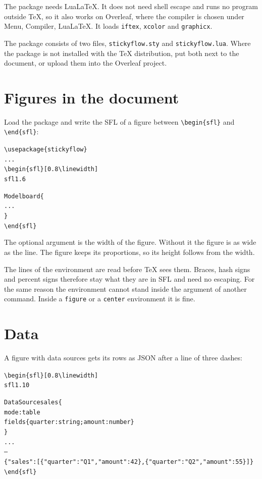 \documentclass{article}
\newenvironment{code}{\par\smallskip\begin{alltt}\small}{\end{alltt}\smallskip}
\begin{document}
The package needs LuaLaTeX. It does not need shell escape and runs no program outside TeX, so it also works on Overleaf, where the compiler
is chosen under Menu, Compiler, LuaLaTeX. It loads \texttt{iftex}, \texttt{xcolor} and \texttt{graphicx}.

The package consists of two files, \texttt{stickyflow.sty} and \texttt{stickyflow.lua}. Where the package is not installed with the TeX
distribution, put both next to the document, or upload them into the Overleaf project.

\section{Figures in the document}

Load the package and write the SFL of a figure between \texttt{\textbackslash{}begin\{sfl\}} and \texttt{\textbackslash{}end\{sfl\}}:

\begin{code}
\textbackslash{}usepackage\{stickyflow\}
...
\textbackslash{}begin\{sfl\}[0.8\textbackslash{}linewidth]
sfl 1.6

Model board \{
  ...
\}
\textbackslash{}end\{sfl\}
\end{code}

The optional argument is the width of the figure. Without it the figure is as wide as the line. The figure keeps its proportions, so its
height follows from the width.

The lines of the environment are read before TeX sees them. Braces, hash signs and percent signs therefore stay what they are in SFL and
need no escaping. For the same reason the environment cannot stand inside the argument of another command. Inside a \texttt{figure} or a
\texttt{center} environment it is fine.

\section{Data}

A figure with data sources gets its rows as JSON after a line of three dashes:

\begin{code}
\textbackslash{}begin\{sfl\}[0.8\textbackslash{}linewidth]
sfl 1.10

DataSource sales \{
  mode: table
  fields \{ quarter: string; amount: number \}
\}
...
---
\{ "sales": [\{ "quarter": "Q1", "amount": 42 \}, \{ "quarter": "Q2", "amount": 55 \}] \}
\textbackslash{}end\{sfl\}
\end{code}
\end{document}
